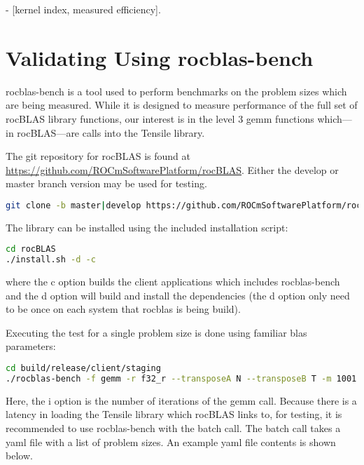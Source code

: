 \documentclass[]{article}
\begin{document}
\begin{center}
	- [kernel index, measured efficiency].
\end{center}

\section{Validating Using rocblas-bench}

rocblas-bench is a tool used to perform benchmarks on the problem sizes which are being measured. While it is designed to measure performance of the full set of rocBLAS library functions, our interest is in the level 3 gemm functions which---in rocBLAS---are calls into the Tensile library.

The git repository for rocBLAS is found at \url{https://github.com/ROCmSoftwarePlatform/rocBLAS}. Either the develop or master branch version may be used for testing.

\begin{lstlisting}[language=bash]
git clone -b master|develop https://github.com/ROCmSoftwarePlatform/rocBLAS.git
\end{lstlisting}

\noindent
The library can be installed using the included installation script:

\begin{lstlisting}[language=bash]
cd rocBLAS
./install.sh -d -c
\end{lstlisting}

\noindent
where the c option builds the client applications which includes rocblas-bench and the d option will build and install the dependencies (the d option only need to be once on each system that rocblas is being build).

Executing the test for a single problem size is done using familiar blas parameters:

\begin{lstlisting}[language=bash]
cd build/release/client/staging
./rocblas-bench -f gemm -r f32_r --transposeA N --transposeB T -m 1001 -n 1536 -k 64 --alpha 1.0 --lda 1001 --ldb 1536 --beta 0.0 --ldc 1001 -i 10 
\end{lstlisting} 

\noindent
Here, the i option is the number of iterations of the gemm call. Because there is a latency in loading the Tensile library which rocBLAS links to, for testing, it is recommended to use rocblas-bench with the batch call. The batch call takes a yaml file with a list of problem sizes. An example yaml file contents is shown below.
\end{document}
